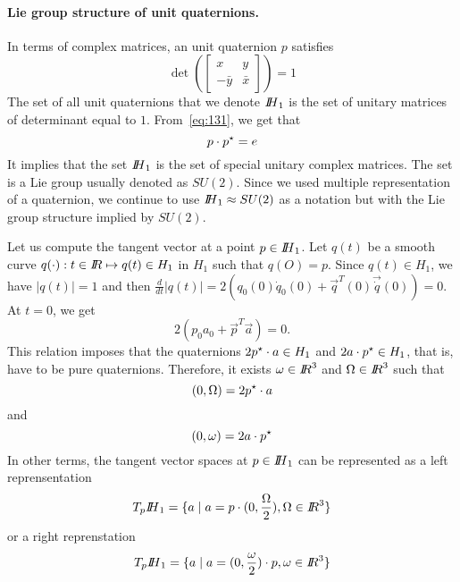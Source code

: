 \paragraph{Lie group structure of unit quaternions.} In terms of complex matrices, an unit quaternion $p$ satisfies
\begin{equation}
  \label{eq:125}
  \det\left(    \begin{bmatrix}
      x &y  \\
      - \bar y  & \bar x
    \end{bmatrix} \right) =1
\end{equation}
The set of all unit quaternions that we denote $\mbox{\rm $I\!\!H$}_1$ is the set of unitary matrices of determinant equal to $1$. From~\eqref{eq:131}, we get that
\begin{equation}
  \label{eq:126}
  p \cdot p^\star = e  
\end{equation}
It implies that the set $\mbox{\rm $I\!\!H$}_1$ is the set of special unitary complex matrices. The set is a Lie group usually denoted as $SU(2)$. Since we used multiple representation of a quaternion, we continue to use $\mbox{\rm $I\!\!H$}_1 \approx SU(2)$ as a notation but with the Lie group structure implied by $SU(2)$.

Let us compute the tangent vector at a point $p \in \mbox{\rm $I\!\!H$}_1$. Let $q(t)$ be  a smooth curve $q(\cdot) : t\in \mbox{\rm $I\!\!R$} \mapsto q(t)\in H_1$ in $H_1$ such that $q(O)= p$.
Since $q(t)\in H_1$, we have $|q(t)|=1$ and then $\frac{d}{dt} |q(t)| = 2(q_0(0) \dot q_0(0) + \vec{q}^T(0) \vec{\dot q}(0) ) =0$. At $t=0$, we get
\begin{equation}
  \label{eq:48}
  2(p_0 a_0 + \vec{p}^T \vec{a})= 0.
\end{equation}
This relation imposes that the quaternions $2 p^\star \cdot a \in H_1$ and $2 a \cdot p^\star \in H_1$, that is, have to be pure quaternions. Therefore, it exists $\omega \in \mbox{\rm $I\!\!R$}^3$  and $\Omega \in \mbox{\rm $I\!\!R$}^3$ such that
\begin{equation}
  \label{eq:132}
  (0, \Omega) = 2 p ^\star \cdot a 
\end{equation}
and
\begin{equation}
  \label{eq:132}
  (0, \omega) = 2 a\cdot p^\star
\end{equation}
In other terms, the tangent vector spaces at $p \in \mbox{\rm $I\!\!H$}_1$ can be represented as a left reprensentation
\begin{equation}
  \label{eq:133}
  T_p\mbox{\rm $I\!\!H$}_1 = \{ a \mid a = p \cdot (0, \frac \Omega 2 ), \Omega \in \mbox{\rm $I\!\!R$}^3\}
\end{equation}
or a right reprenstation
\begin{equation}
  \label{eq:1330}
  T_p{\mbox{\rm $I\!\!H$}_1} = \{ a \mid a =  (0, \frac \omega 2 ) \cdot p, \omega \in \mbox{\rm $I\!\!R$}^3\}
\end{equation}

